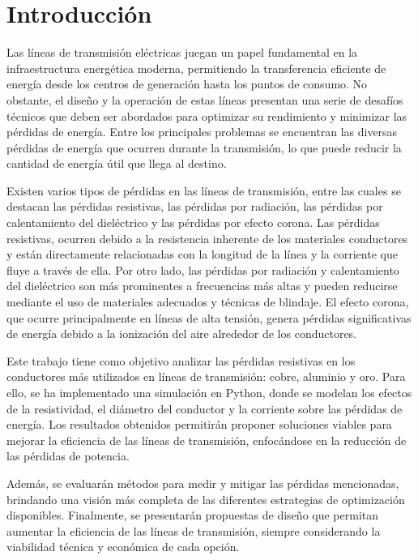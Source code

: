\section{Introducción}

    Las líneas de transmisión eléctricas juegan un papel fundamental en la infraestructura energética moderna, permitiendo la transferencia eficiente de energía desde los centros de generación hasta los puntos de consumo. No obstante, el diseño y la operación de estas líneas presentan una serie de desafíos técnicos que deben ser abordados para optimizar su rendimiento y minimizar las pérdidas de energía. Entre los principales problemas se encuentran las diversas pérdidas de energía que ocurren durante la transmisión, lo que puede reducir la cantidad de energía útil que llega al destino.

    Existen varios tipos de pérdidas en las líneas de transmisión, entre las cuales se destacan las pérdidas resistivas, las pérdidas por radiación, las pérdidas por calentamiento del dieléctrico y las pérdidas por efecto corona. Las pérdidas resistivas, ocurren debido a la resistencia inherente de los materiales conductores y están directamente relacionadas con la longitud de la línea y la corriente que fluye a través de ella. Por otro lado, las pérdidas por radiación y calentamiento del dieléctrico son más prominentes a frecuencias más altas y pueden reducirse mediante el uso de materiales adecuados y técnicas de blindaje. El efecto corona, que ocurre principalmente en líneas de alta tensión, genera pérdidas significativas de energía debido a la ionización del aire alrededor de los conductores.
    
    Este trabajo tiene como objetivo analizar las pérdidas resistivas en los conductores más utilizados en líneas de transmisión: cobre, aluminio y oro. Para ello, se ha implementado una simulación en Python, donde se modelan los efectos de la resistividad, el diámetro del conductor y la corriente sobre las pérdidas de energía. Los resultados obtenidos permitirán proponer soluciones viables para mejorar la eficiencia de las líneas de transmisión, enfocándose en la reducción de las pérdidas de potencia.
    
    Además, se evaluarán métodos para medir y mitigar las pérdidas mencionadas, brindando una visión más completa de las diferentes estrategias de optimización disponibles. Finalmente, se presentarán propuestas de diseño que permitan aumentar la eficiencia de las líneas de transmisión, siempre considerando la viabilidad técnica y económica de cada opción.




\newpage